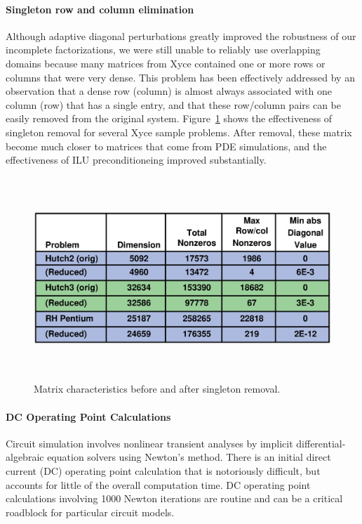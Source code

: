\documentclass[10pt,fleqn]{article}
\begin{document}
\paragraph{Singleton row and column elimination}

Although adaptive diagonal perturbations greatly improved the robustness of our
incomplete factorizations, we were still unable to reliably use
overlapping domains because many matrices from Xyce contained one or
more rows or columns that were very dense.  This problem has been
effectively addressed by an observation that a dense row
(column) is almost always associated with one column (row) that has a
single entry, and that these row/column pairs can be easily removed from the
original system.  Figure~\ref{singleton_stats} shows the effectiveness
of singleton removal for several Xyce sample problems.  After removal,
these matrix become much closer to matrices that come from PDE
simulations, and the effectiveness of ILU preconditioneing improved substantially.
\begin{figure} 
\begin{center} 
\includegraphics[height=3in]{singleton_stats}
\end{center} 
\caption{\label{singleton_stats} Matrix characteristics before and
after singleton removal.}
\end{figure} 


\paragraph{DC Operating Point Calculations}
Circuit simulation involves nonlinear transient analyses by implicit
differential-algebraic equation solvers using Newton's method.
There is an initial direct current (DC) operating point calculation
that is notoriously difficult, but accounts for
little of the overall computation time.  DC operating point calculations 
involving 1000 Newton iterations are routine and can be a critical
roadblock for particular circuit models.  
\end{document}
